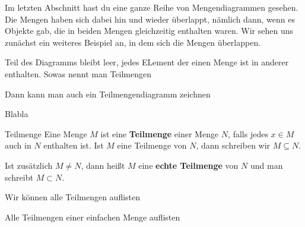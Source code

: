 \documentclass[../../main.tex]{subfiles}
\begin{document}
Im letzten Abschnitt hast du eine ganze Reihe von Mengendiagrammen gesehen. Die Mengen haben sich dabei hin und wieder überlappt, nämlich dann, wenn es Objekte gab, die in beiden Mengen gleichzeitig enthalten waren. Wir sehen uns zunächst ein weiteres Beispiel an, in dem sich die Mengen überlappen.

\begin{example}{}
\end{example}

Teil des Diagramms bleibt leer, jedes ELement der einen Menge ist in anderer enthalten. Sowas nennt man Teilmengen

Dann kann man auch ein Teilmengendiagramm zeichnen

\begin{example}{}
\end{example}

Blabla

\begin{definition}{Teilmenge}
    Eine Menge $M$ ist eine \textbf{Teilmenge} einer Menge $N$, falls jedes $x\in M$ auch in $N$ enthalten ist. Ist $M$ eine Teilmenge von $N$, dann schreiben wir $M\subseteq N$.

    Ist zusätzlich $M\neq N$, dann heißt $M$ eine \textbf{echte Teilmenge} von $N$ und man schreibt $M\subset N$.
\end{definition}

Wir können alle Teilmengen auflisten

\begin{example}{}
    Alle Teilmengen einer einfachen Menge auflisten
\end{example}
\end{document}
